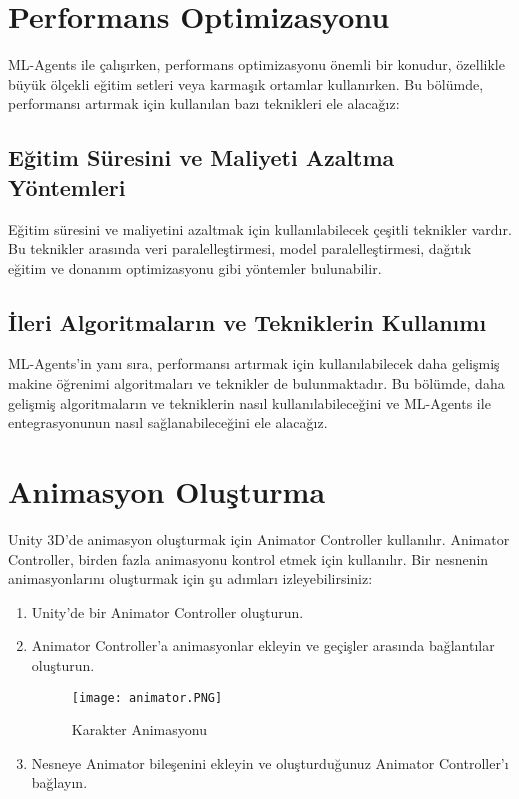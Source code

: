 \documentclass{article}
\begin{document}
\section{Performans Optimizasyonu}
    ML-Agents ile çalışırken, performans optimizasyonu önemli bir konudur, özellikle büyük ölçekli eğitim setleri veya karmaşık ortamlar kullanırken. Bu bölümde, performansı artırmak için kullanılan bazı teknikleri ele alacağız:

    \subsection{Eğitim Süresini ve Maliyeti Azaltma Yöntemleri}
        Eğitim süresini ve maliyetini azaltmak için kullanılabilecek çeşitli teknikler vardır. Bu teknikler arasında veri paralelleştirmesi, model paralelleştirmesi, dağıtık eğitim ve donanım optimizasyonu gibi yöntemler bulunabilir.

    \subsection{İleri Algoritmaların ve Tekniklerin Kullanımı}
        ML-Agents'in yanı sıra, performansı artırmak için kullanılabilecek daha gelişmiş makine öğrenimi algoritmaları ve teknikler de bulunmaktadır. Bu bölümde, daha gelişmiş algoritmaların ve tekniklerin nasıl kullanılabileceğini ve ML-Agents ile entegrasyonunun nasıl sağlanabileceğini ele alacağız.
\clearpage

\section{Animasyon Oluşturma}

Unity 3D'de animasyon oluşturmak için Animator Controller kullanılır. Animator Controller, birden fazla animasyonu kontrol etmek için kullanılır. Bir nesnenin animasyonlarını oluşturmak için şu adımları izleyebilirsiniz:

\begin{enumerate}
    \item Unity'de bir Animator Controller oluşturun.
    \item Animator Controller'a animasyonlar ekleyin ve geçişler arasında bağlantılar oluşturun.
    \begin{figure}[h]
    \centering
    \texttt{[image: animator.PNG]}
    \caption{Karakter Animasyonu}
    \label{fig:resim18}
    \end{figure}
    \item Nesneye Animator bileşenini ekleyin ve oluşturduğunuz Animator Controller'ı bağlayın.
\end{enumerate}
\end{document}
